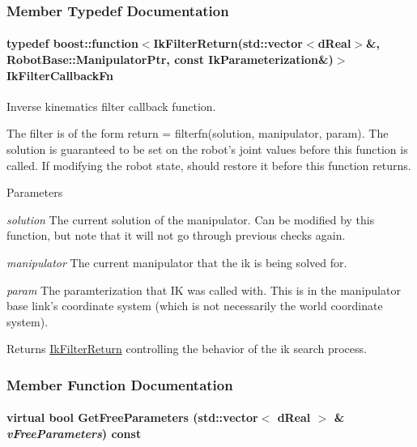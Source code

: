 \subsubsection{Member Typedef Documentation}
\hypertarget{classOpenRAVE_1_1IkSolverBase_a2f7085e3e716d58bbbc95fa53926313e}{
\paragraph[{IkFilterCallbackFn}]{\setlength{\rightskip}{0pt plus 5cm}typedef boost::function$<${\bf IkFilterReturn}(std::vector$<$dReal$>$\&, RobotBase::ManipulatorPtr, const {\bf IkParameterization}\&)$>$ {\bf IkFilterCallbackFn}}\hfill}
\label{classOpenRAVE_1_1IkSolverBase_a2f7085e3e716d58bbbc95fa53926313e}
Inverse kinematics filter callback function.

The filter is of the form {\ttfamily return = filterfn(solution, manipulator, param)}. The solution is guaranteed to be set on the robot's joint values before this function is called. If modifying the robot state, should restore it before this function returns.


\begin{DoxyParams}{Parameters}
\item[{\em solution}]The current solution of the manipulator. Can be modified by this function, but note that it will not go through previous checks again. \item[{\em manipulator}]The current manipulator that the ik is being solved for. \item[{\em param}]The paramterization that IK was called with. This is in the manipulator base link's coordinate system (which is not necessarily the world coordinate system). \end{DoxyParams}
\begin{DoxyReturn}{Returns}
\hyperlink{namespaceOpenRAVE_a7a8cf38163621e225d83b4b3a8ff62e9}{IkFilterReturn} controlling the behavior of the ik search process. 
\end{DoxyReturn}


\subsubsection{Member Function Documentation}
\hypertarget{classOpenRAVE_1_1IkSolverBase_a37c664c2f07d523edfa463d06a1654c6}{
\paragraph[{GetFreeParameters}]{\setlength{\rightskip}{0pt plus 5cm}virtual bool GetFreeParameters (std::vector$<$ dReal $>$ \& {\em vFreeParameters}) const}\hfill}
\label{classOpenRAVE_1_1IkSolverBase_a37c664c2f07d523edfa463d06a1654c6}


